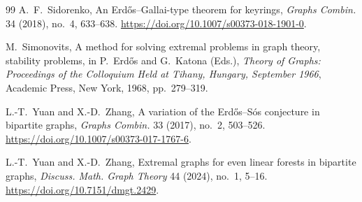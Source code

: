 \documentclass[12pt]{article}
\theoremstyle{definition}
\theoremstyle{remark}
\begin{document}
\begin{thebibliography}{99}
A.~F.~Sidorenko,
An Erd\H{o}s--Gallai-type theorem for keyrings,
\emph{Graphs Combin.} 34 (2018), no.~4, 633--638.
\url{https://doi.org/10.1007/s00373-018-1901-0}.

M.~Simonovits,
A method for solving extremal problems in graph theory,
stability problems,
in P.~Erd\H{o}s and G.~Katona (Eds.),
\emph{Theory of Graphs:
Proceedings of the Colloquium Held at Tihany, Hungary,
September 1966},
Academic Press, New York, 1968, pp.~279--319.

L.-T.~Yuan and X.-D.~Zhang,
A variation of the Erd\H{o}s--S\'os conjecture in bipartite graphs,
\emph{Graphs Combin.} 33 (2017), no.~2, 503--526.
\url{https://doi.org/10.1007/s00373-017-1767-6}.

L.-T.~Yuan and X.-D.~Zhang,
Extremal graphs for even linear forests in bipartite graphs,
\emph{Discuss. Math. Graph Theory} 44 (2024), no.~1, 5--16.
\url{https://doi.org/10.7151/dmgt.2429}.

\end{thebibliography}
\end{document}
